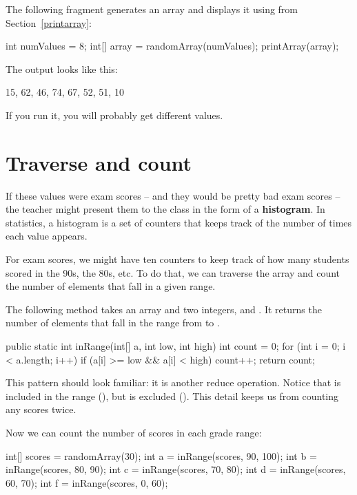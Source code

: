 The following fragment generates an array and displays it using  from Section~\ref{printarray}:

\begin{code}
int numValues = 8;
int[] array = randomArray(numValues);
printArray(array);
\end{code}

The output looks like this:

\begin{stdout}
{15, 62, 46, 74, 67, 52, 51, 10}
\end{stdout}

If you run it, you will probably get different values.


\section{Traverse and count}


If these values were exam scores -- and they would be pretty bad exam scores -- the teacher might present them to the class in the form of a {\bf histogram}.
In statistics, a histogram is a set of counters that keeps track of the number of times each value appears.

For exam scores, we might have ten counters to keep track of how many students scored in the 90s, the 80s, etc.
To do that, we can traverse the array and count the number of elements that fall in a given range.

The following method takes an array and two integers,  and .
It returns the number of elements that fall in the range from   to .

\begin{code}
public static int inRange(int[] a, int low, int high) {
    int count = 0;
    for (int i = 0; i < a.length; i++) {
        if (a[i] >= low && a[i] < high) {
            count++;
        }
    }
    return count;
}
\end{code}


This pattern should look familiar: it is another reduce operation.
Notice that  is included in the range (\java{>=}), but  is excluded (\java{<}).
This detail keeps us from counting any scores twice.

Now we can count the number of scores in each grade range:

\begin{code}
int[] scores = randomArray(30);
int a = inRange(scores, 90, 100);
int b = inRange(scores, 80, 90);
int c = inRange(scores, 70, 80);
int d = inRange(scores, 60, 70);
int f = inRange(scores, 0, 60);
\end{code}


